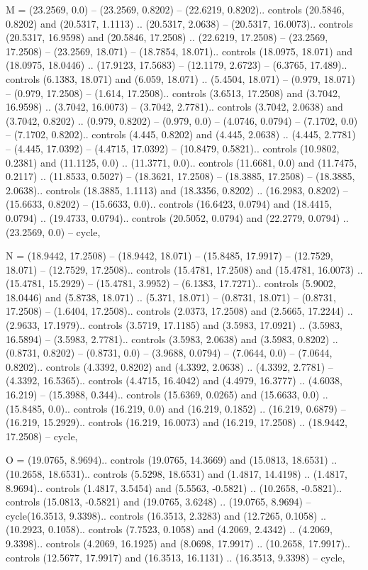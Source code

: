 M = {(23.2569, 0.0) -- (23.2569, 0.8202) -- (22.6219, 0.8202).. controls (20.5846, 0.8202) and (20.5317, 1.1113) .. (20.5317, 2.0638) -- (20.5317, 16.0073).. controls (20.5317, 16.9598) and (20.5846, 17.2508) .. (22.6219, 17.2508) -- (23.2569, 17.2508) -- (23.2569, 18.071) -- (18.7854, 18.071).. controls (18.0975, 18.071) and (18.0975, 18.0446) .. (17.9123, 17.5683) -- (12.1179, 2.6723) -- (6.3765, 17.489).. controls (6.1383, 18.071) and (6.059, 18.071) .. (5.4504, 18.071) -- (0.979, 18.071) -- (0.979, 17.2508) -- (1.614, 17.2508).. controls (3.6513, 17.2508) and (3.7042, 16.9598) .. (3.7042, 16.0073) -- (3.7042, 2.7781).. controls (3.7042, 2.0638) and (3.7042, 0.8202) .. (0.979, 0.8202) -- (0.979, 0.0) -- (4.0746, 0.0794) -- (7.1702, 0.0) -- (7.1702, 0.8202).. controls (4.445, 0.8202) and (4.445, 2.0638) .. (4.445, 2.7781) -- (4.445, 17.0392) -- (4.4715, 17.0392) -- (10.8479, 0.5821).. controls (10.9802, 0.2381) and (11.1125, 0.0) .. (11.3771, 0.0).. controls (11.6681, 0.0) and (11.7475, 0.2117) .. (11.8533, 0.5027) -- (18.3621, 17.2508) -- (18.3885, 17.2508) -- (18.3885, 2.0638).. controls (18.3885, 1.1113) and (18.3356, 0.8202) .. (16.2983, 0.8202) -- (15.6633, 0.8202) -- (15.6633, 0.0).. controls (16.6423, 0.0794) and (18.4415, 0.0794) .. (19.4733, 0.0794).. controls (20.5052, 0.0794) and (22.2779, 0.0794) .. (23.2569, 0.0) -- cycle},

N = {(18.9442, 17.2508) -- (18.9442, 18.071) -- (15.8485, 17.9917) -- (12.7529, 18.071) -- (12.7529, 17.2508).. controls (15.4781, 17.2508) and (15.4781, 16.0073) .. (15.4781, 15.2929) -- (15.4781, 3.9952) -- (6.1383, 17.7271).. controls (5.9002, 18.0446) and (5.8738, 18.071) .. (5.371, 18.071) -- (0.8731, 18.071) -- (0.8731, 17.2508) -- (1.6404, 17.2508).. controls (2.0373, 17.2508) and (2.5665, 17.2244) .. (2.9633, 17.1979).. controls (3.5719, 17.1185) and (3.5983, 17.0921) .. (3.5983, 16.5894) -- (3.5983, 2.7781).. controls (3.5983, 2.0638) and (3.5983, 0.8202) .. (0.8731, 0.8202) -- (0.8731, 0.0) -- (3.9688, 0.0794) -- (7.0644, 0.0) -- (7.0644, 0.8202).. controls (4.3392, 0.8202) and (4.3392, 2.0638) .. (4.3392, 2.7781) -- (4.3392, 16.5365).. controls (4.4715, 16.4042) and (4.4979, 16.3777) .. (4.6038, 16.219) -- (15.3988, 0.344).. controls (15.6369, 0.0265) and (15.6633, 0.0) .. (15.8485, 0.0).. controls (16.219, 0.0) and (16.219, 0.1852) .. (16.219, 0.6879) -- (16.219, 15.2929).. controls (16.219, 16.0073) and (16.219, 17.2508) .. (18.9442, 17.2508) -- cycle},

O = {(19.0765, 8.9694).. controls (19.0765, 14.3669) and (15.0813, 18.6531) .. (10.2658, 18.6531).. controls (5.5298, 18.6531) and (1.4817, 14.4198) .. (1.4817, 8.9694).. controls (1.4817, 3.5454) and (5.5563, -0.5821) .. (10.2658, -0.5821).. controls (15.0813, -0.5821) and (19.0765, 3.6248) .. (19.0765, 8.9694) -- cycle(16.3513, 9.3398).. controls (16.3513, 2.3283) and (12.7265, 0.1058) .. (10.2923, 0.1058).. controls (7.7523, 0.1058) and (4.2069, 2.4342) .. (4.2069, 9.3398).. controls (4.2069, 16.1925) and (8.0698, 17.9917) .. (10.2658, 17.9917).. controls (12.5677, 17.9917) and (16.3513, 16.1131) .. (16.3513, 9.3398) -- cycle},

